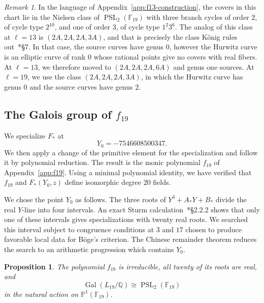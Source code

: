 \documentclass[10pt]{amsart}
\numberwithin{equation}{section}
\newtheorem{proposition}[theorem]{Proposition}
\theoremstyle{definition}
\theoremstyle{remark}
\newtheorem{remark}[theorem]{Remark}
\newcommand{\PP}{\mathbb P}
\newcommand{\F}{\mathbb{F}}
\newcommand{\Q}{\mathbb{Q}}
\newcommand{\PSL}{\operatorname{PSL}}
\newcommand{\Gal}{\operatorname{Gal}}
\begin{document}
\begin{remark}
    In the language of Appendix~\ref{app:f13-construction}, the covers in this
chart lie in the Nielsen class of $\PSL_2(\F_{19})$ with three branch cycles
of order $2$, of cycle type $2^{10}$, and one of order $3$, of cycle type
$1^2 3^6$.  The analog of this class at $\ell=13$ is $(2A,2A,2A,3A)$, and
that is precisely the class K\"onig rules out~\cite{Koenig2017}*{\S7}. In that case, 
the source curves have genus $0$, however the Hurwitz curve is an elliptic curve of
rank $0$ whose rational points give no covers with real fibers.  At
$\ell=13$, we therefore moved to $(2A,2A,2A,6A)$ and genus one sources. At $\ell=19$, we use the class $(2A,2A,2A,3A)$, in which the Hurwitz curve has genus $0$ and the source curves have genus $2$. 
\end{remark}












 

\subsection{The Galois group of \texorpdfstring{$f_{19}$}{f19}}
\label{subsec:l19-specialization}
We specialize $F_*$ at
\[
 Y_0=-7546608500347.
\]
We then apply a change of the primitive element for the specialization and follow it by polynomial reduction. The result is the monic polynomial $f_{19}$ of
Appendix~\ref{app:f19}. Using a minimal polynomial identity, we have verified that $f_{19}$ and $F_{*}(Y_0,z)$ define isomorphic degree $20$ fields.

We chose the point $Y_0$ as follows. The three roots of $Y^3+A_*Y+B_*$ divide the real $Y$-line into four intervals. An exact Sturm calculation~\cite{BasuPollackRoy2006}*{\S2.2.2} shows that only one of these intervals gives specializations with twenty real roots. We searched this interval subject to congruence conditions at $3$ and $17$ chosen to produce favorable local data for B\"oge's criterion. The Chinese remainder theorem reduces the search to an arithmetic progression which contains $Y_0$.
\begin{proposition}\label{prop:l19-projective}
The polynomial $f_{19}$ is irreducible, all twenty of its roots are real,
and
\[
 \Gal(L_{19}/\Q)\cong\PSL_2(\F_{19})
\]
in the natural action on $\PP^1(\F_{19})$.
\end{proposition}
\end{document}
